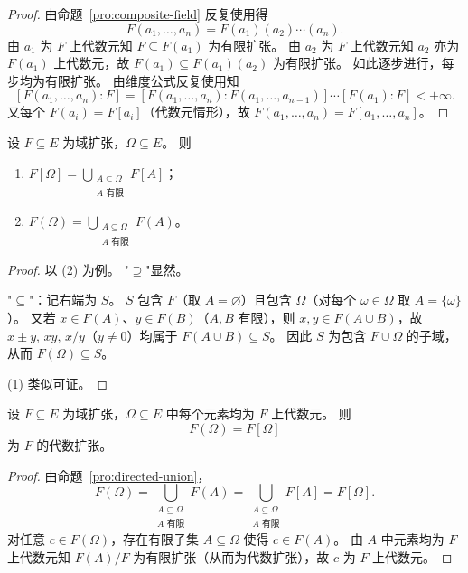 \documentclass[lang=cn,a4paper,newtx]{elegantbook}
\begin{document}
\begin{proof}
  由命题~\ref{pro:composite-field} 反复使用得
  \[
    F(a_1,\dots,a_n)=F(a_1)(a_2)\cdots(a_n).
  \]
  由 $a_1$ 为 $F$ 上代数元知 $F\subseteq F(a_1)$ 为有限扩张。
  由 $a_2$ 为 $F$ 上代数元知 $a_2$ 亦为 $F(a_1)$ 上代数元，故 $F(a_1)\subseteq F(a_1)(a_2)$ 为有限扩张。
  如此逐步进行，每步均为有限扩张。
  由维度公式反复使用知
  \[
    [F(a_1,\dots,a_n):F]=[F(a_1,\dots,a_n):F(a_1,\dots,a_{n-1})]\cdots[F(a_1):F]<+\infty.
  \]
  又每个 $F(a_i)=F[a_i]$（代数元情形），故 $F(a_1,\dots,a_n)=F[a_1,\dots,a_n]$。
\end{proof}

\begin{proposition}\label{directed-union}
  设 $F\subseteq E$ 为域扩张，$\Omega\subseteq E$。
  则
  \begin{enumerate}
    \item $\displaystyle F[\Omega]=\bigcup_{\substack{A\subseteq\Omega \\ A\text{ 有限}}} F[A]$；
    \item $\displaystyle F(\Omega)=\bigcup_{\substack{A\subseteq\Omega \\ A\text{ 有限}}} F(A)$。
  \end{enumerate}
\end{proposition}

\begin{proof}
  以 (2) 为例。
  "$\supseteq$"显然。

  "$\subseteq$"：记右端为 $S$。
  $S$ 包含 $F$（取 $A=\varnothing$）且包含 $\Omega$（对每个 $\omega\in\Omega$ 取 $A=\{\omega\}$）。
  又若 $x\in F(A)$、$y\in F(B)$（$A,B$ 有限），则 $x,y\in F(A\cup B)$，故 $x\pm y,\,xy,\,x/y$（$y\ne 0$）均属于 $F(A\cup B)\subseteq S$。
  因此 $S$ 为包含 $F\cup\Omega$ 的子域，从而 $F(\Omega)\subseteq S$。

  (1) 类似可证。
\end{proof}

\begin{theorem}
  设 $F\subseteq E$ 为域扩张，$\Omega\subseteq E$ 中每个元素均为 $F$ 上代数元。
  则
  \[
    F(\Omega)=F[\Omega]
  \]
  为 $F$ 的代数扩张。
\end{theorem}

\begin{proof}
  由命题~\ref{pro:directed-union}，
  \[
    F(\Omega)=\bigcup_{\substack{A\subseteq\Omega \\ A\text{ 有限}}} F(A)=\bigcup_{\substack{A\subseteq\Omega \\ A\text{ 有限}}} F[A]=F[\Omega].
  \]
  对任意 $c\in F(\Omega)$，存在有限子集 $A\subseteq\Omega$ 使得 $c\in F(A)$。
  由 $A$ 中元素均为 $F$ 上代数元知 $F(A)/F$ 为有限扩张（从而为代数扩张），故 $c$ 为 $F$ 上代数元。
\end{proof}
\end{document}
